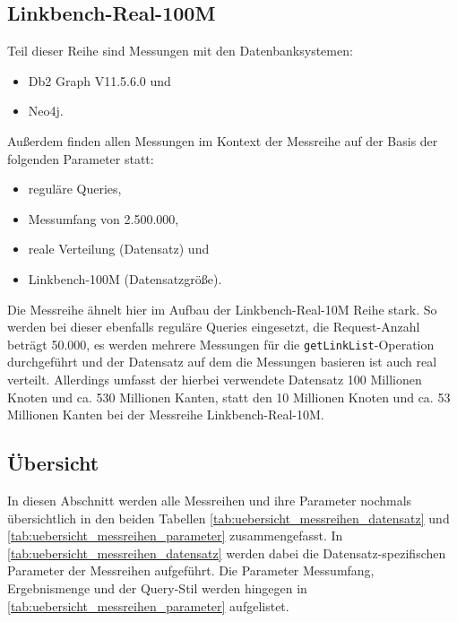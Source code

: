 \subsection{Linkbench-Real-100M}
Teil dieser Reihe sind Messungen mit den Datenbanksystemen:
\begin{itemize}
    \item Db2 Graph V11.5.6.0 und 
    \item Neo4j. 
\end{itemize}

Außerdem finden allen Messungen im Kontext der Messreihe auf der Basis der folgenden Parameter statt:
\begin{itemize}
    \item reguläre Queries,
    \item Messumfang von 2.500.000,
    \item reale Verteilung (Datensatz) und
    \item Linkbench-100M (Datensatzgröße).
\end{itemize}
Die Messreihe ähnelt hier im Aufbau der Linkbench-Real-10M Reihe stark. So werden bei dieser ebenfalls reguläre Queries eingesetzt, die Request-Anzahl beträgt 50.000, es werden mehrere Messungen für die \texttt{getLinkList}-Operation durchgeführt und der Datensatz auf dem die Messungen basieren ist auch real verteilt. Allerdings umfasst der hierbei verwendete Datensatz 100 Millionen Knoten und ca. 530 Millionen Kanten, statt den 10 Millionen Knoten und ca. 53 Millionen Kanten bei der Messreihe Linkbench-Real-10M.

\subsection{Übersicht}
In diesen Abschnitt werden alle Messreihen und ihre Parameter nochmals übersichtlich in den beiden Tabellen \autoref{tab:uebersicht_messreihen_datensatz} und \autoref{tab:uebersicht_messreihen_parameter} zusammengefasst. In \autoref{tab:uebersicht_messreihen_datensatz} werden dabei die Datensatz-spezifischen Parameter der Messreihen aufgeführt. Die Parameter Messumfang, Ergebnismenge und der Query-Stil werden hingegen in \autoref{tab:uebersicht_messreihen_parameter} aufgelistet.

